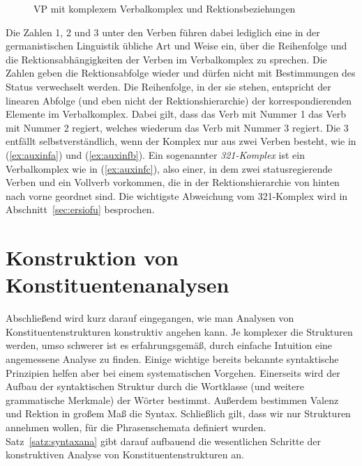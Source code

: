 \begin{figure}
  \centering
  \caption{VP mit komplexem Verbalkomplex und Rektionsbeziehungen}
  \label{fig:vkrekext}
\end{figure}

Die Zahlen 1, 2 und 3 unter den Verben führen dabei lediglich eine in der germanistischen Linguistik übliche Art und Weise ein, über die Reihenfolge und die Rektionsabhängigkeiten der Verben im Verbalkomplex zu sprechen.
Die Zahlen geben die Rektionsabfolge wieder und dürfen nicht mit Bestimmungen des Status verwechselt werden.
Die Reihenfolge, in der sie stehen, entspricht der linearen Abfolge (und eben nicht der Rektionshierarchie) der korrespondierenden Elemente im Verbalkomplex.
Dabei gilt, dass das Verb mit Nummer 1 das Verb mit Nummer 2 regiert, welches wiederum das Verb mit Nummer 3 regiert.
Die 3 entfällt selbstverständlich, wenn der Komplex nur aus zwei Verben besteht, wie in (\ref{ex:auxinfa}) und (\ref{ex:auxinfb}).
Ein sogenannter \textit{321-Komplex} ist ein Verbalkomplex wie in (\ref{ex:auxinfc}), also einer, in dem zwei statusregierende Verben und ein Vollverb vorkommen, die in der Rektionshierarchie von hinten nach vorne geordnet sind.
Die wichtigste Abweichung vom 321-Komplex wird in Abschnitt~\ref{sec:ersiofu} besprochen.

\section{Konstruktion von Konstituentenanalysen}

\label{sec:syntaxana}

Abschließend wird kurz darauf eingegangen, wie man Analysen von Konstituentenstrukturen konstruktiv angehen kann.
Je komplexer die Strukturen werden, umso schwerer ist es erfahrungsgemäß, durch einfache Intuition eine angemessene Analyse zu finden.
Einige wichtige bereits bekannte syntaktische Prinzipien helfen aber bei einem systematischen Vorgehen.
Einerseits wird der Aufbau der syntaktischen Struktur durch die Wortklasse (und weitere grammatische Merkmale) der Wörter bestimmt.
Außerdem bestimmen Valenz und Rektion in großem Maß die Syntax.
Schließlich gilt, dass wir nur Strukturen annehmen wollen, für die Phrasenschemata definiert wurden.
Satz~\ref{satz:syntaxana} gibt darauf aufbauend die wesentlichen Schritte der konstruktiven Analyse von Konstituentenstrukturen an.

